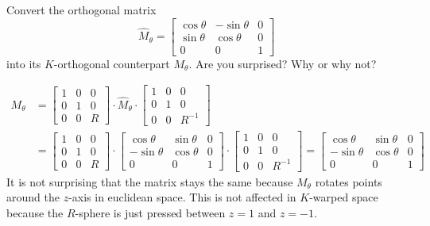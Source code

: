 \documentclass[newpage,hints,handout,noauthor,nooutcomes,12pt]{ximera}
\begin{document}
\begin{problem}
  Convert the orthogonal matrix
  \[
  \hat{M}_\theta=\begin{bmatrix}
  \cos\theta & -\sin\theta & 0\\
  \sin\theta & \cos\theta & 0\\
  0 & 0 & 1
  \end{bmatrix}
  \]
  into its $K$-orthogonal counterpart $M_\theta$. Are you surprised? Why or why
  not?
  
\begin{freeResponse}
\begin{align*}
M_\theta &= \begin{bmatrix}
1 & 0 & 0\\
0 & 1 & 0\\
0 & 0 & R%
\end{bmatrix} \cdot \hat{M}_\theta \cdot
\begin{bmatrix}
1 & 0 & 0\\
0 & 1 & 0\\
0 & 0 & R^{-1}%
\end{bmatrix} \\
&= \begin{bmatrix}
1 & 0 & 0\\
0 & 1 & 0\\
0 & 0 & R%
\end{bmatrix} \cdot 
\begin{bmatrix}
  \cos\theta & \sin\theta & 0\\
  -\sin\theta & \cos\theta & 0\\
  0 & 0 & 1
  \end{bmatrix} \cdot
\begin{bmatrix}
1 & 0 & 0\\
0 & 1 & 0\\
0 & 0 & R^{-1}%
\end{bmatrix}
= \begin{bmatrix}
  \cos\theta & \sin\theta & 0\\
  -\sin\theta & \cos\theta & 0\\
  0 & 0 & 1
  \end{bmatrix} 
\end{align*} 
It is not surprising that the matrix stays the same because $M_\theta$ rotates points around the $z$-axis in euclidean space. This is not affected in $K$-warped space because the $R$-sphere is just pressed between $z=1$ and $z=-1$.
\end{freeResponse}

\end{problem}
\end{document}
